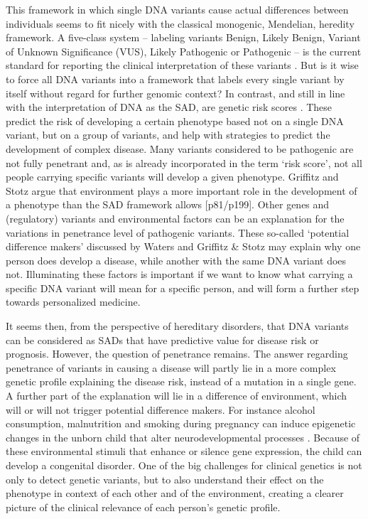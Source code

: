 This framework in which single DNA variants cause actual differences between individuals seems to fit nicely with the classical monogenic, Mendelian, heredity framework. 
A five-class system – labeling variants Benign, Likely Benign, Variant of Unknown Significance (VUS), Likely Pathogenic or Pathogenic – is the current standard for reporting the clinical interpretation of these variants  \cite{Richards_2015}.  
But is it wise to force all DNA variants into a framework that labels every single variant by itself without regard for further genomic context? 
In contrast, and still in line with the interpretation of DNA as the SAD, are genetic risk scores \cite{Jostins_2011,Yoo_2015}. 
These predict the risk of developing a certain phenotype based not on a single DNA variant, but on a group of variants, and help with strategies to predict the development of complex disease. 
Many variants considered to be pathogenic are not fully penetrant and, as is already incorporated in the term ‘risk score’, not all people carrying specific variants will develop a given phenotype. 
Griffitz and Stotz argue that environment plays a more important role in the development of a phenotype than the SAD framework allows \cite{Griffitz_2013}[p81/p199]. 
Other genes and (regulatory) variants and environmental factors can be an explanation for the variations in penetrance level of pathogenic variants. 
These so-called ‘potential difference makers’ discussed by Waters and Griffitz \& Stotz may explain why one person does develop a disease, while another with the same DNA variant does not. 
Illuminating these factors is important if we want to know what carrying a specific DNA variant will mean for a specific person, and will form a further step towards personalized medicine. 

It seems then, from the perspective of hereditary disorders, that DNA variants can be considered as SADs that have predictive value for disease risk or prognosis.
However, the question of penetrance remains. 
The answer regarding penetrance of variants in causing a disease will partly lie in a more complex genetic profile explaining the disease risk, instead of a mutation in a single gene. 
A further part of the explanation will lie in a difference of environment, which will or will not trigger potential difference makers. 
For instance alcohol consumption, malnutrition and smoking during pregnancy can induce epigenetic changes in the unborn child that alter neurodevelopmental processes \cite{Portales_Casamar_2016,Banik_2017}. 
Because of these environmental stimuli that enhance or silence gene expression, the child can develop a congenital disorder. 
One of the big  challenges for clinical genetics is not only to detect genetic variants, but to also understand their effect on the phenotype in context of each other and of the environment, creating a clearer picture of the clinical relevance of each person’s genetic profile.

